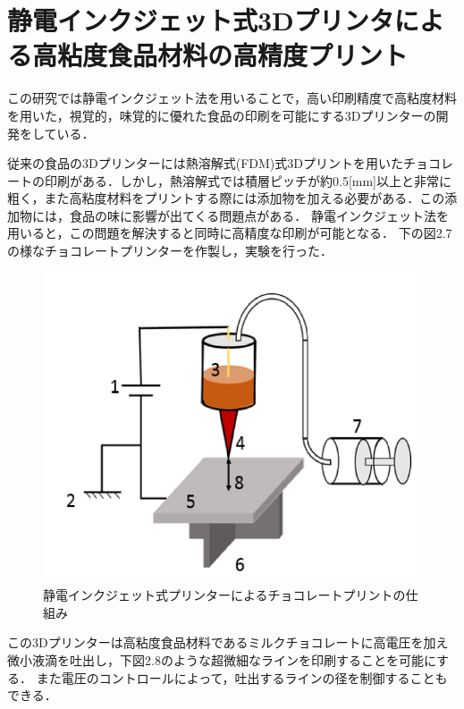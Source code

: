 \section{静電インクジェット式3Dプリンタによる高粘度食品材料の高精度プリント\cite{e}}
\label{sec:enum}
この研究では静電インクジェット法を用いることで，高い印刷精度で高粘度材料を用いた，視覚的，味覚的に優れた食品の印刷を可能にする3Dプリンターの開発をしている．

従来の食品の3Dプリンターには熱溶解式(FDM)式3Dプリントを用いたチョコレートの印刷がある．しかし，熱溶解式では積層ピッチが約0.5[mm]以上と非常に粗く，また高粘度材料をプリントする際には添加物を加える必要がある．この添加物には，食品の味に影響が出てくる問題点がある．
静電インクジェット法を用いると，この問題を解決すると同時に高精度な印刷が可能となる．
下の図2.7の様なチョコレートプリンターを作製し，実験を行った．


\begin{figure}[H]
  \centering
  \includegraphics[width=11truecm]{./fig/seidenn.png}
  \caption{静電インクジェット式プリンターによるチョコレートプリントの仕組み}
  \label{fig:ferretss}
\end{figure}

この3Dプリンターは高粘度食品材料であるミルクチョコレートに高電圧を加え微小液滴を吐出し，下図2.8のような超微細なラインを印刷することを可能にする．
また電圧のコントロールによって，吐出するラインの径を制御することもできる．

